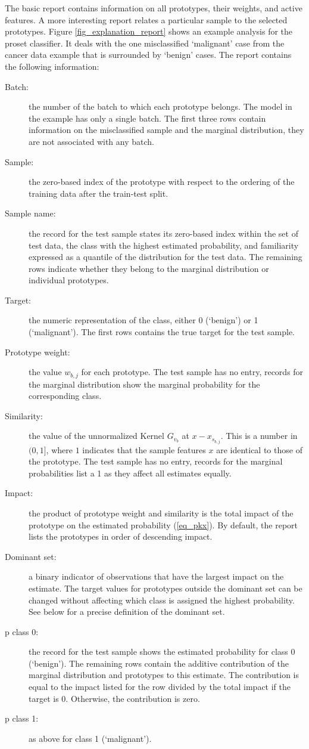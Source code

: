 The basic report contains information on all prototypes, their weights, and active features.
A more interesting report relates a particular sample to the selected prototypes.
Figure \ref{fig_explanation_report} shows an example analysis for the proset classifier.
It deals with the one misclassified `malignant' case from the cancer data example that is surrounded by `benign' cases.
The report contains the following information:
%
\begin{description}
\item[Batch:] the number of the batch to which each prototype belongs.
The model in the example has only a single batch.
The first three rows contain information on the misclassified sample and the marginal distribution, they are not associated with any batch.
%
\item[Sample:] the zero-based index of the prototype with respect to the ordering of the training data after the train-test split.
%
\item[Sample name:] the record for the test sample states its zero-based index within the set of test data, the class with the highest estimated probability, and familiarity expressed as a quantile of the distribution for the test data.
The remaining rows indicate whether they belong to the marginal distribution or individual prototypes.
%
\item[Target:] the numeric representation of the class, either 0 (`benign') or 1 (`malignant').
The first rows contains the true target for the test sample.
%
\item[Prototype weight:] the value $w_{b,j}$ for each prototype.
The test sample has no entry, records for the marginal distribution show the marginal probability for the corresponding class.
%
\item[Similarity:] the value of the unnormalized Kernel $G_{v_b}$ at $x-x_{s_{b,j}}$.
This is a number in $(0,1]$, where $1$ indicates that the sample features $x$ are identical to those of the prototype.
The test sample has no entry, records for the marginal probabilities list a 1 as they affect all estimates equally.
%
\item[Impact:] the product of prototype weight and similarity is the total impact of the prototype on the estimated probability (\ref{eq_pkx}).
By default, the report lists the prototypes in order of descending impact.
%
\item[Dominant set:] a binary indicator of observations that have the largest impact on the estimate.
The target values for prototypes outside the dominant set can be changed without affecting which class is assigned the highest probability.
See below for a precise definition of the dominant set.
%
\item[p class 0:] the record for the test sample shows the estimated probability for class 0 (`benign').
The remaining rows contain the additive contribution of the marginal distribution and prototypes to this estimate.
The contribution is equal to the impact listed for the row divided by the total impact if the target is 0.
Otherwise, the contribution is zero.
%
\item[p class 1:] as above for class 1 (`malignant').
\end{description}
